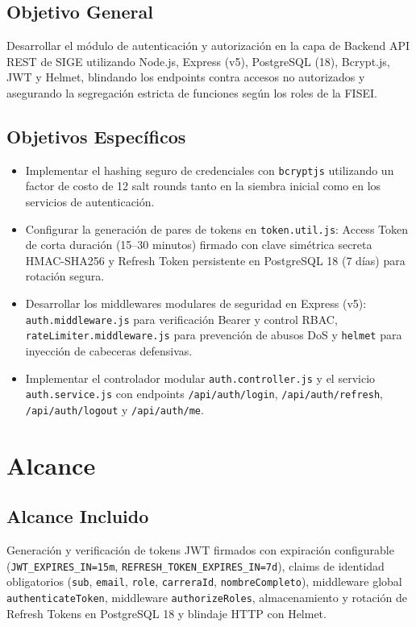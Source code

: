\documentclass[12pt,a4paper]{article}
\begin{document}
\subsection{Objetivo General}
Desarrollar el módulo de autenticación y autorización en la capa de Backend API REST de SIGE utilizando Node.js, Express (v5), PostgreSQL (18), Bcrypt.js, JWT y Helmet, blindando los endpoints contra accesos no autorizados y asegurando la segregación estricta de funciones según los roles de la FISEI.

\subsection{Objetivos Específicos}
\begin{itemize}[leftmargin=1.5em, itemsep=1.5pt, topsep=1.5pt]
    \item Implementar el hashing seguro de credenciales con \texttt{bcryptjs} utilizando un factor de costo de 12 salt rounds tanto en la siembra inicial como en los servicios de autenticación.
    \item Configurar la generación de pares de tokens en \texttt{token.util.js}: Access Token de corta duración (15--30 minutos) firmado con clave simétrica secreta HMAC-SHA256 y Refresh Token persistente en PostgreSQL 18 (7 días) para rotación segura.
    \item Desarrollar los middlewares modulares de seguridad en Express (v5): \texttt{auth.middleware.js} para verificación Bearer y control RBAC, \texttt{rateLimiter.middleware.js} para prevención de abusos DoS y \texttt{helmet} para inyección de cabeceras defensivas.
    \item Implementar el controlador modular \texttt{auth.controller.js} y el servicio \texttt{auth.service.js} con endpoints \texttt{/api/auth/login}, \texttt{/api/auth/refresh}, \texttt{/api/auth/logout} y \texttt{/api/auth/me}.
\end{itemize}

\section{Alcance}

\subsection{Alcance Incluido}
Generación y verificación de tokens JWT firmados con expiración configurable (\texttt{JWT\_EXPIRES\_IN=15m}, \texttt{REFRESH\_TOKEN\_EXPIRES\_IN=7d}), claims de identidad obligatorios (\texttt{sub}, \texttt{email}, \texttt{role}, \texttt{carreraId}, \texttt{nombreCompleto}), middleware global \texttt{authenticateToken}, middleware \texttt{authorizeRoles}, almacenamiento y rotación de Refresh Tokens en PostgreSQL 18 y blindaje HTTP con Helmet.
\end{document}

